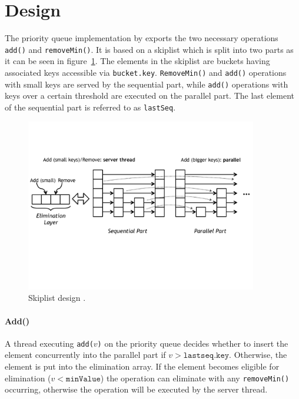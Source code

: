 
\section{Design}

The priority queue implementation by \citeauthor{calciu_adaptive_2014} exports the two necessary operations \texttt{add()} and \texttt{removeMin()}. It is based on a skiplist which is split into two parts as it can be seen in figure~\ref{fig:pqe}. The elements in the skiplist are buckets having associated keys accessible via \texttt{bucket.key}. \texttt{RemoveMin()} and \texttt{add()} operations with small keys are served by the sequential part, while \texttt{add()} operations with keys over a certain threshold are executed on the parallel part. The last element of the sequential part is referred to as \texttt{lastSeq}.

\begin{figure}[htb]
	\centering
	\includegraphics[width=0.9\textwidth]{graphics/pqe.pdf}
	\caption{Skiplist design \cite{calciu_adaptive_2014}.}
	\label{fig:pqe}
\end{figure}

\paragraph{Add()}

A thread executing \texttt{add($v$)} on the priority queue decides whether to insert the element concurrently into the parallel part if $v > \texttt{lastseq.key}$. Otherwise, the element is put into the elimination array. If the element becomes eligible for elimination ($v < \texttt{minValue}$) the operation can eliminate with any \texttt{removeMin()} occurring, otherwise the operation will be executed by the server thread.

